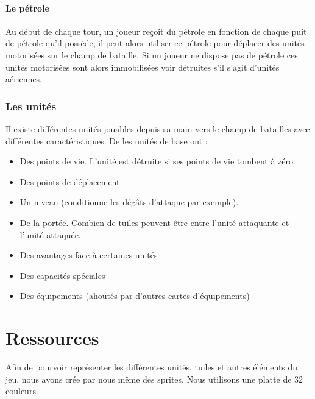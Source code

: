 \paragraph{Le pétrole}

Au début de chaque tour, un joueur reçoit du pétrole en fonction de chaque puit de pétrole qu'il possède, il peut alors utiliser ce pétrole pour déplacer des unités motorisées sur le champ de bataille. Si un joueur ne dispose pas de pétrole ces unités motorisées sont alors immobilisées voir détruites s'il s'agit d'unités aériennes.


\subsubsection{Les unités}
Il existe différentes unités jouables depuis sa main vers le champ de batailles avec différentes caractéristiques.\n 
De les unités de base ont : 
\begin{itemize}
    \item Des points de vie. L'unité est détruite si ses points de vie tombent à zéro.
    \item Des points de déplacement.
    \item Un niveau (conditionne les dégâts d'attaque par exemple).
    \item De la portée. Combien de tuiles peuvent être entre l'unité attaquante et l'unité attaquée.
    \item Des avantages face à certaines unités
    \item Des capacités spéciales
    \item Des équipements (ahoutés par d'autres cartes d'équipements)
\end{itemize}


\newpage
\section{Ressources}

Afin de pourvoir représenter les différentes unités, tuiles et autres éléments du jeu, nous avons crée par nous même des sprites. Nous utilisons une platte de 32 couleurs.

